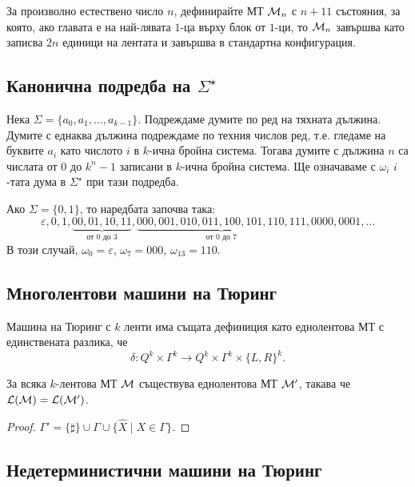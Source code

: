 \begin{problem}
  За произволно естествено число $n$, дефинирайте МТ $\mathcal{M}_n$ с $n+11$ състояния, за която,
  ако главата е на най-лявата $1$-ца върху блок от $1$-ци, то $\mathcal{M}_n$
  завършва като записва $2n$ единици на лентата и завършва в стандартна конфигурация.
\end{problem}


\subsection*{Канонична подредба на $\Sigma^\star$}

Нека $\Sigma = \{a_0,a_1,\dots,a_{k-1}\}$.
Подреждаме думите по ред на тяхната дължина.
Думите с еднаква дължина подреждаме по техния числов ред, т.е.
гледаме на буквите $a_i$ като числото $i$ в $k$-ична бройна система.
Тогава думите с дължина $n$ са числата от $0$ до $k^n-1$ записани в $k$-ична бройна система.
Ще означаваме с $\omega_i$ $i$-тата дума в $\Sigma^\star$ при тази подредба.

\begin{example}
  Ако $\Sigma = \{0,1\}$, то наредбата започва така:
  \[\varepsilon, 0, 1, \underbrace{00, 01, 10, 11}_{\text{от $0$ до $3$}}, \underbrace{000, 001, 010, 011, 100, 101, 110, 111}_{\text{от $0$ до $7$}}, 0000, 0001, \dots\]
  В този случай, $\omega_0 = \varepsilon$, $\omega_7 = 000$, $\omega_{13} = 110$.
\end{example}

\subsection*{Многолентови машини на Тюринг}


Машина на Тюринг с $k$ ленти има същата дефиниция като еднолентова МТ
с единствената разлика, че
\[\delta: Q^k \times \Gamma^k\to Q^k \times \Gamma^k \times \{L,R\}^k.\]

\begin{prop}
  За всяка $k$-лентова МТ $\mathcal{M}$ съществува еднолентова МТ $\mathcal{M}'$,
  такава че $\mathcal{L}(\mathcal{M}) = \mathcal{L}(\mathcal{M}')$.
\end{prop}
\begin{proof}
  $\Gamma' = \{\sharp\} \cup \Gamma \cup \{\hat{X} \mid X \in \Gamma\}$.
\end{proof}

\subsection*{Недетерминистични машини на Тюринг}

